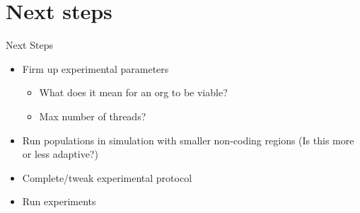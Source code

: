 \documentclass[aspectratio=169]{beamer}
\begin{document}
\section{Next steps}
\label{sec-2}
\begin{frame}[label=sec-2-1]{Next Steps}
\begin{itemize}
\item Firm up experimental parameters 
\begin{itemize}
\item What does it mean for an org to be viable?
\item Max number of threads?
\end{itemize}
\item Run populations in simulation with smaller non-coding regions (Is this more or less adaptive?)
\item Complete/tweak experimental protocol
\item Run experiments
\end{itemize}
\end{frame}
\end{document}
